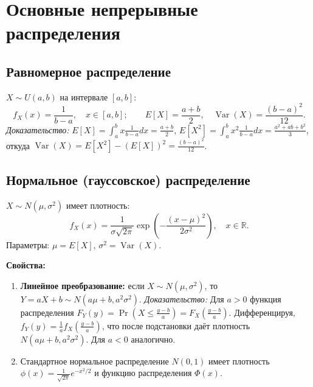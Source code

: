 \documentclass[10pt]{article}
\begin{document}
\section{Основные непрерывные распределения}

\subsection{Равномерное распределение}
$X \sim U(a, b)$ на интервале $[a, b]$:
\[
f_X(x) = \frac{1}{b-a}, \quad x \in [a,b]; \qquad E[X] = \frac{a+b}{2}, \quad \operatorname{Var}(X) = \frac{(b-a)^2}{12}.
\]
\textit{Доказательство:} $E[X] = \int_a^b x \frac{1}{b-a}dx = \frac{a+b}{2}$, $E[X^2] = \int_a^b x^2 \frac{1}{b-a}dx = \frac{a^2+ab+b^2}{3}$, откуда $\operatorname{Var}(X)=E[X^2]-(E[X])^2 = \frac{(b-a)^2}{12}$.

\subsection{Нормальное (гауссовское) распределение}
\begin{definition}
$X \sim N(\mu, \sigma^2)$ имеет плотность:
\[
f_X(x) = \frac{1}{\sigma\sqrt{2\pi}} \exp\left(-\frac{(x-\mu)^2}{2\sigma^2}\right), \quad x \in \mathbb{R}.
\]
Параметры: $\mu = E[X]$, $\sigma^2 = \operatorname{Var}(X)$.
\end{definition}

\textbf{Свойства:}
\begin{enumerate}
    \item \textbf{Линейное преобразование:} если $X \sim N(\mu, \sigma^2)$, то $Y = aX + b \sim N(a\mu + b, a^2\sigma^2)$.
    \textit{Доказательство:} Для $a>0$ функция распределения $F_Y(y) = \Pr(X \le \frac{y-b}{a}) = F_X(\frac{y-b}{a})$. Дифференцируя, $f_Y(y) = \frac{1}{a} f_X(\frac{y-b}{a})$, что после подстановки даёт плотность $N(a\mu+b, a^2\sigma^2)$. Для $a<0$ аналогично.
    \item Стандартное нормальное распределение $N(0,1)$ имеет плотность $\phi(x) = \frac{1}{\sqrt{2\pi}} e^{-x^2/2}$ и функцию распределения $\Phi(x)$.
\end{enumerate}
\end{document}
